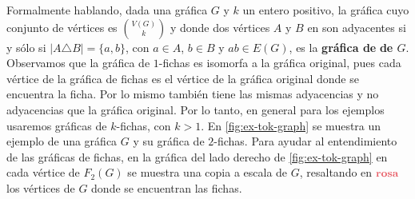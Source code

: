 Formalmente hablando, dada una gr\'afica $G$ y $k$ un entero positivo, la
gr\'afica cuyo conjunto de v\'ertices es $\binom{V(G)}{k}$ y donde dos
v\'ertices $A$ y $B$ en son adyacentes si y s\'olo si $|A \triangle B| =
\{a,b\}$, con $a \in A$, $b \in B$ y $ab \in E(G)$, es la \textbf{gr\'afica de}
 \textbf{de $G$}.
Observamos que la gr\'afica de $1$-fichas es isomorfa a la gr\'afica original,
pues cada v\'ertice de la gr\'afica de fichas es el v\'ertice de la gr\'afica
original donde se encuentra la ficha. Por lo mismo tambi\'en tiene las mismas
adyacencias y no adyacencias que la gr\'afica original. Por lo tanto, en general
para los ejemplos usaremos gr\'aficas de $k$-fichas, con $k > 1$. En
\cref{fig:ex-tok-graph} se muestra un ejemplo de una gr\'afica $G$ y su
gr\'afica de $2$-fichas. Para ayudar al entendimiento de las gr\'aficas de
fichas, en la gr\'afica del lado derecho de \cref{fig:ex-tok-graph} en cada
v\'ertice de $F_2(G)$ se muestra una copia a escala de $G$, resaltando en
${\color{rosa}\bf rosa}$ los v\'ertices de $G$ donde se encuentran las fichas.

